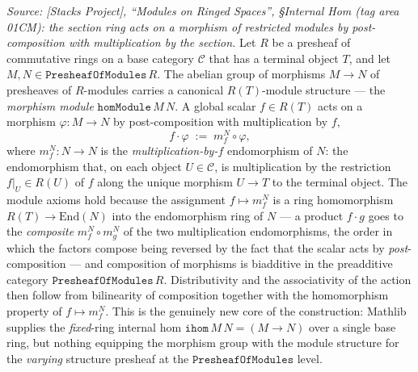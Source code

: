 \begin{definition}

  \label{def:presheaf_internal_hom_value}
  \textit{Source: [Stacks Project], ``Modules on Ringed Spaces'', \S Internal Hom
  (tag area 01CM): the section ring acts on a morphism of restricted modules by
  post-composition with multiplication by the section.}
  Let \(R\) be a presheaf of commutative rings on a base category \(\mathcal{C}\)
  that has a terminal object \(T\), and let \(M, N \in \mathtt{PresheafOfModules}\,R\).
  The abelian group of morphisms \(M \longrightarrow N\) of presheaves of \(R\)-modules
  carries a canonical \(R(T)\)-module structure --- the \emph{morphism module}
  \(\mathtt{homModule}\,M\,N\). A global scalar \(f \in R(T)\) acts on a morphism
  \(\varphi : M \to N\) by post-composition with multiplication by \(f\),
  \[
    f \cdot \varphi \;:=\; m_f^{N} \circ \varphi,
  \]
  where \(m_f^{N} : N \to N\) is the \emph{multiplication-by-\(f\)} endomorphism of
  \(N\): the endomorphism that, on each object \(U \in \mathcal{C}\), is multiplication
  by the restriction \(f|_U \in R(U)\) of \(f\) along the unique morphism \(U \to T\)
  to the terminal object. The module axioms hold because the assignment
  \(f \mapsto m_f^{N}\) is a ring homomorphism \(R(T) \to \mathrm{End}(N)\) into the
  endomorphism ring of \(N\) --- a product \(f \cdot g\) goes to the \emph{composite}
  \(m_f^{N} \circ m_g^{N}\) of the two multiplication endomorphisms, the order in which
  the factors compose being reversed by the fact that the scalar acts by
  \emph{post}-composition --- and composition of morphisms is biadditive in the
  preadditive category \(\mathtt{PresheafOfModules}\,R\). Distributivity and the
  associativity of the action then follow from bilinearity of composition together with
  the homomorphism property of \(f \mapsto m_f^{N}\). This is the genuinely new core of
  the construction: Mathlib supplies the \emph{fixed}-ring internal hom
  \(\mathtt{ihom}\,M\,N = (M \to N)\) over a single base ring, but nothing equipping the
  morphism group with the module structure for the \emph{varying} structure presheaf at
  the \(\mathtt{PresheafOfModules}\) level.
\end{definition}

